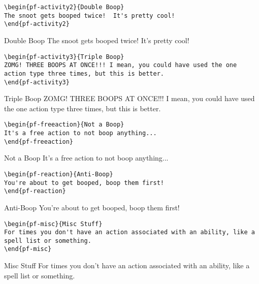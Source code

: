 \begin{multicols}{2}
\hrulefill{}
\begin{verbatim}
\begin{pf-activity2}{Double Boop}
The snoot gets booped twice!  It's pretty cool!
\end{pf-activity2}
\end{verbatim}
\begin{pf-activity2}{Double Boop}
The snoot gets booped twice!  It's pretty cool!
\end{pf-activity2}

\hrulefill{}
\begin{verbatim}
\begin{pf-activity3}{Triple Boop}
ZOMG! THREE BOOPS AT ONCE!!! I mean, you could have used the one action type three times, but this is better.
\end{pf-activity3}
\end{verbatim}
\begin{pf-activity3}{Triple Boop}
ZOMG! THREE BOOPS AT ONCE!!! I mean, you could have used the one action type three times, but this is better.
\end{pf-activity3}

\hrulefill{}
\begin{verbatim}
\begin{pf-freeaction}{Not a Boop}
It's a free action to not boop anything...
\end{pf-freeaction}
\end{verbatim}
\begin{pf-freeaction}{Not a Boop}
It's a free action to not boop anything...
\end{pf-freeaction}

\hrulefill{}
\begin{verbatim}
\begin{pf-reaction}{Anti-Boop}
You're about to get booped, boop them first!
\end{pf-reaction}
\end{verbatim}
\begin{pf-reaction}{Anti-Boop}
You're about to get booped, boop them first!
\end{pf-reaction}

\hrulefill{}
\begin{verbatim}
\begin{pf-misc}{Misc Stuff}
For times you don't have an action associated with an ability, like a spell list or something.
\end{pf-misc}
\end{verbatim}
\begin{pf-misc}{Misc Stuff}
For times you don't have an action associated with an ability, like a spell list or something.
\end{pf-misc}



\end{multicols}

